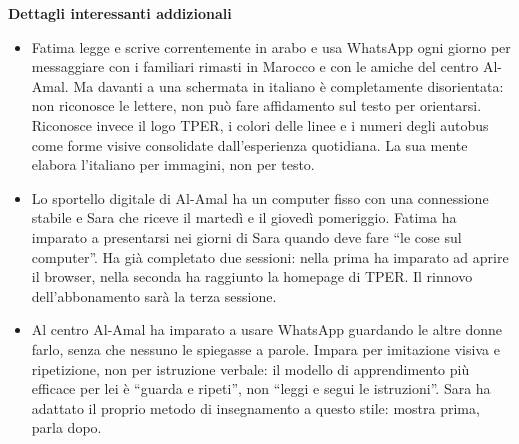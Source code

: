 ﻿\documentclass[11pt,a4paper]{article}
\begin{document}
\begin{center}
\vspace{0.3cm}



\begin{tcolorbox}[base,colback=backgroundColor!50]
    \textbf{Dettagli interessanti addizionali} \\[4pt]
    {\small
    \begin{itemize}[leftmargin=*]
        \item Fatima legge e scrive correntemente in arabo
        e usa WhatsApp ogni giorno per messaggiare con
        i familiari rimasti in Marocco e con le amiche
        del centro Al-Amal. Ma davanti a una schermata
        in italiano è completamente disorientata:
        non riconosce le lettere, non può fare affidamento
        sul testo per orientarsi. Riconosce invece il logo
        TPER, i colori delle linee e i numeri degli autobus
        come forme visive consolidate dall'esperienza
        quotidiana. La sua mente elabora l'italiano
        per immagini, non per testo.

        \item Lo sportello digitale di Al-Amal ha un
        computer fisso con una connessione stabile e
        Sara che riceve il martedì e il giovedì pomeriggio.
        Fatima ha imparato a presentarsi nei giorni
        di Sara quando deve fare ``le cose sul computer''.
        Ha già completato due sessioni: nella prima
        ha imparato ad aprire il browser, nella seconda
        ha raggiunto la homepage di TPER. Il rinnovo
        dell'abbonamento sarà la terza sessione.

        \item Al centro Al-Amal ha imparato a usare
        WhatsApp guardando le altre donne farlo,
        senza che nessuno le spiegasse a parole.
        Impara per imitazione visiva e ripetizione,
        non per istruzione verbale: il modello di
        apprendimento più efficace per lei è
        ``guarda e ripeti'', non ``leggi e segui
        le istruzioni''. Sara ha adattato
        il proprio metodo di insegnamento
        a questo stile: mostra prima, parla dopo.


\end{itemize}}
\end{tcolorbox}
\end{center}
\end{document}

